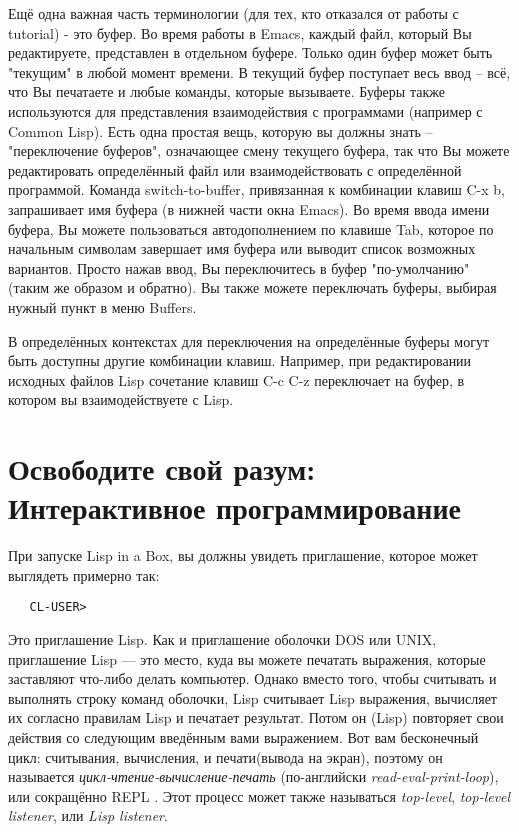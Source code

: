 Ещё одна важная часть терминологии (для тех, кто отказался от работы с tutorial) - это
буфер. Во время работы в Emacs, каждый файл, который Вы редактируете, представлен в
отдельном буфере. Только один буфер может быть "текущим" в любой момент времени. В текущий
буфер поступает весь ввод -- всё, что Вы печатаете и любые команды, которые
вызываете. Буферы также используются для представления взаимодействия с программами
(например с Common Lisp). Есть одна простая вещь, которую вы должны знать -- "переключение
буферов", означающее смену текущего буфера, так что Вы можете редактировать определённый
файл или взаимодействовать с определённой программой. Команда switch-to-buffer,
привязанная к комбинации клавиш C-x b, запрашивает имя буфера (в нижней части окна
Emacs). Во время ввода имени буфера, Вы можете пользоваться автодополнением по клавише
Tab, которое по начальным символам завершает имя буфера или выводит список возможных
вариантов. Просто нажав ввод, Вы переключитесь в буфер "по-умолчанию" (таким же образом и
обратно). Вы также можете переключать буферы, выбирая нужный пункт в меню Buffers.

В определённых контекстах для переключения на определённые буферы могут быть доступны
другие комбинации клавиш. Например, при редактировании исходных файлов Lisp сочетание
клавиш C-c C-z переключает на буфер, в котором вы взаимодействуете с Lisp.

\section{Освободите свой разум: Интерактивное программирование}

При запуске Lisp in a Box, вы должны увидеть приглашение, которое может выглядеть примерно
так:

\begin{verbatim}
   CL-USER>
\end{verbatim}

Это приглашение Lisp. Как и приглашение оболочки DOS или UNIX, приглашение Lisp --- это
место, куда вы можете печатать выражения, которые заставляют что-либо делать
компьютер. Однако вместо того, чтобы считывать и выполнять строку команд оболочки, Lisp
считывает Lisp выражения, вычисляет их согласно правилам Lisp и печатает результат. Потом
он (Lisp) повторяет свои действия со следующим введённым вами выражением. Вот вам
бесконечный цикл: считывания, вычисления, и печати(вывода на экран), поэтому он называется
\textit{цикл-чтение-вычисление-печать} (по-английски \textit{read-eval-print-loop}), или
сокращённо REPL . Этот процесс может также называться \textit{top-level},
\textit{top-level listener}, или \textit{Lisp listener}.

